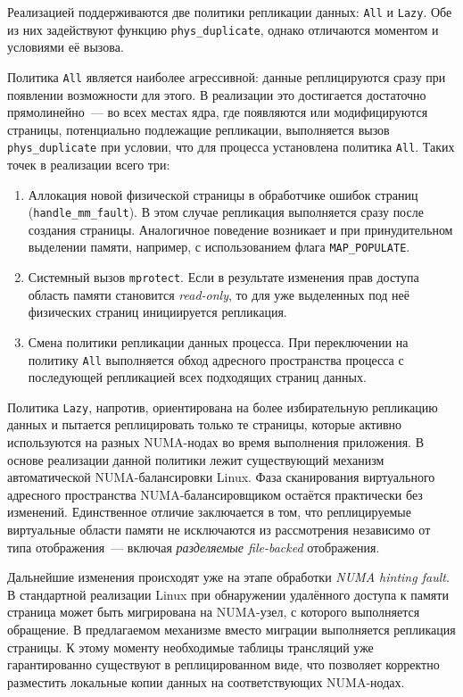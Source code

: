 Реализацией поддерживаются две политики репликации данных: \texttt{All} и \texttt{Lazy}. Обе из них задействуют функцию \texttt{phys\_duplicate}, однако отличаются моментом и условиями её вызова.

Политика \texttt{All} является наиболее агрессивной: данные реплицируются сразу при появлении возможности для этого. В реализации это достигается достаточно прямолинейно~--- во всех местах ядра, где появляются или модифицируются страницы, потенциально подлежащие репликации, выполняется вызов \texttt{phys\_duplicate} при условии, что для процесса установлена политика \texttt{All}. Таких точек в реализации всего три:
\begin{enumerate}
    \item Аллокация новой физической страницы в обработчике ошибок страниц (\texttt{handle\_mm\_fault}). В этом случае репликация выполняется сразу после создания страницы. Аналогичное поведение возникает и при принудительном выделении памяти, например, с использованием флага \texttt{MAP\_POPULATE}.

    \item Системный вызов \texttt{mprotect}. Если в результате изменения прав доступа область памяти становится \textit{read-only}, то для уже выделенных под неё физических страниц инициируется репликация.

    \item Смена политики репликации данных процесса. При переключении на политику \texttt{All} выполняется обход адресного пространства процесса с последующей репликацией всех подходящих страниц данных.
\end{enumerate}

Политика \texttt{Lazy}, напротив, ориентирована на более избирательную репликацию данных и пытается реплицировать только те страницы, которые активно используются на разных NUMA-нодах во время выполнения приложения. В основе реализации данной политики лежит существующий механизм автоматической NUMA-балансировки Linux. Фаза сканирования виртуального адресного пространства NUMA-балансировщиком остаётся практически без изменений. Единственное отличие заключается в том, что реплицируемые виртуальные области памяти не исключаются из рассмотрения независимо от типа отображения~--- включая \textit{разделяемые file-backed} отображения.

Дальнейшие изменения происходят уже на этапе обработки \textit{NUMA hinting fault}. В стандартной реализации Linux при обнаружении удалённого доступа к памяти страница может быть мигрирована на NUMA-узел, с которого выполняется обращение. В предлагаемом механизме вместо миграции выполняется репликация страницы. К этому моменту необходимые таблицы трансляций уже гарантированно существуют в реплицированном виде, что позволяет корректно разместить локальные копии данных на соответствующих NUMA-нодах.

